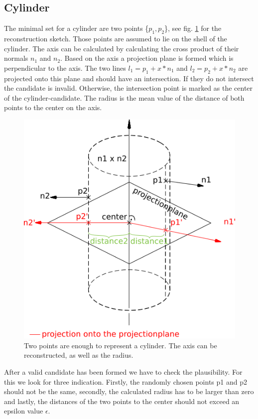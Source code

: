 \documentclass[../ClassicThesis.tex]{subfiles}
\begin{document}
\subsection{Cylinder}
The minimal set for a cylinder are two points \{$p_1, p_2$\}, see fig. \ref{fig:cylinder} for the reconstruction sketch. Those points are assumed to lie on the shell of the cylinder. The axis can be calculated by calculating the cross product of their normals $n_1$ and $n_2$. Based on the axis a projection plane is formed which is perpendicular to the axis. The two lines $l_1 = p_1 + x*n_1$ and $l_2 = p_2 + x*n_2$ are projected onto this plane and should have an intersection. If they do not intersect the candidate is invalid. Otherwise, the intersection point is marked as the center of the cylinder-candidate. The radius is the mean value of the distance of both points to the center on the axis.
\begin{figure}[!ht]
    \centering
    \includegraphics[width=\columnwidth]{Images/cylinder.png}
    \caption{Two points are enough to represent a cylinder. The axis can be reconstructed, as well as the radius.}
    \label{fig:cylinder}
\end{figure}

After a valid candidate has been formed we have to check the plausibility. For this we look for three indication. Firstly, the randomly chosen points p1 and p2 should not be the same, secondly, the calculated radius has to be larger than zero and lastly, the distances of the two points to the center should not exceed an epsilon value $\epsilon$.
\end{document}
